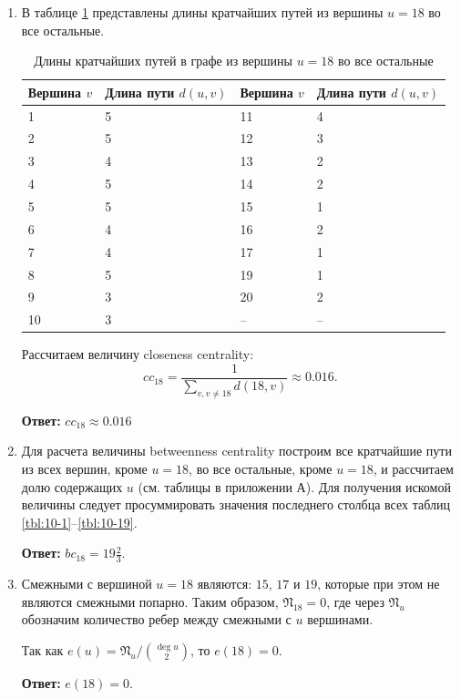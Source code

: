 \documentclass[12pt, a4paper]{extarticle}
\newcommand{\Answer}[1]{\textbf{Ответ:} #1 \\}
\begin{document}
\begin{enumerate}
    \item В таблице \ref{tbl:10-spls} представлены длины кратчайших путей из вершины $u = 18$ во все остальные.
        \begin{table}[h!]
            \caption{Длины кратчайших путей в графе из вершины $u = 18$ во все остальные}
            \label{tbl:10-spls}
            \begin{tabularx}{\textwidth}{|X|X|X|X|}
                \hline
                Вершина $v$ & Длина пути $d(u, v)$ & Вершина $v$ & Длина пути $d(u, v)$ \\
                \hline
                1  & 5 & 11 & 4  \\
                \hline
                2  & 5 & 12 & 3  \\
                \hline
                3  & 4 & 13 & 2  \\
                \hline
                4  & 5 & 14 & 2  \\
                \hline
                5  & 5 & 15 & 1  \\
                \hline
                6  & 4 & 16 & 2  \\
                \hline
                7  & 4 & 17 & 1  \\
                \hline
                8  & 5 & 19 & 1  \\
                \hline
                9  & 3 & 20 & 2  \\
                \hline
                10 & 3 & -- & -- \\
                \hline
            \end{tabularx}
        \end{table}
        
        Рассчитаем величину closeness centrality:
        \begin{equation}
            cc_{18} = \frac{1}{\sum_{v, v \ne 18} d(18, v)} \approx 0.016.
        \end{equation}
        
        \Answer{$cc_{18} \approx 0.016$}
        
    \item Для расчета величины betweenness centrality построим все кратчайшие пути из всех вершин, кроме
        $u = 18$, во все остальные, кроме $u = 18$, и рассчитаем долю содержащих $u$ (см. таблицы в приложении А).
        Для получения искомой величины следует просуммировать значения последнего столбца всех таблиц 
        \ref{tbl:10-1}--\ref{tbl:10-19}.
        
        \Answer{$bc_{18} = 19 \frac{2}{3}$.}
        
    \item Смежными с вершиной $u = 18$ являются: $15$, $17$ и $19$, которые при этом не являются смежными 
        попарно. Таким образом, $\mathfrak{N}_{18} = 0$, где через $\mathfrak{N}_{u}$ обозначим количество 
        ребер между смежными с $u$ вершинами.
        
        Так как $e(u) = \mathfrak{N}_{u} / \binom{\deg u}{2}$, то $e(18) = 0$.
        
        \Answer{$e(18) = 0$.}
\end{enumerate}
\end{document}
